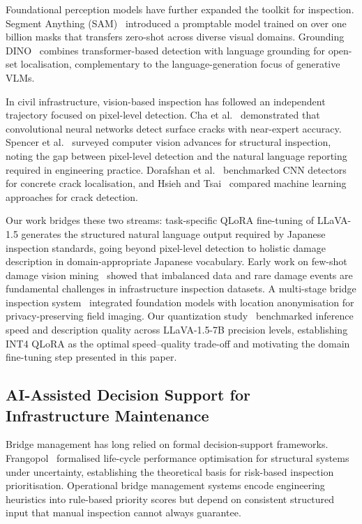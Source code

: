 \documentclass[twocolumn]{article}
\begin{document}
Foundational perception models have further expanded the toolkit for inspection.
Segment Anything (SAM)~\cite{kirillov2023sam} introduced a promptable model
trained on over one billion masks that transfers zero-shot across diverse
visual domains.
Grounding DINO~\cite{liu2023groundingdino} combines transformer-based detection
with language grounding for open-set localisation, complementary to the
language-generation focus of generative VLMs.

In civil infrastructure, vision-based inspection has followed an independent
trajectory focused on pixel-level detection.
Cha et al.~\cite{cha2017deepcrack} demonstrated that convolutional neural
networks detect surface cracks with near-expert accuracy.
Spencer et al.~\cite{spencer2019vision} surveyed computer vision advances for
structural inspection, noting the gap between pixel-level detection and the
natural language reporting required in engineering practice.
Dorafshan et al.~\cite{dorafshan2018concrete} benchmarked CNN detectors for
concrete crack localisation, and Hsieh and Tsai~\cite{hsieh2020concrete}
compared machine learning approaches for crack detection.

Our work bridges these two streams: task-specific QLoRA fine-tuning of
LLaVA-1.5 generates the structured natural language output required by
Japanese inspection standards, going beyond pixel-level detection to holistic
damage description in domain-appropriate Japanese vocabulary.
Early work on few-shot damage vision mining~\cite{yasuno2023fewshot}
showed that imbalanced data and rare damage events are fundamental
challenges in infrastructure inspection datasets.
A multi-stage bridge inspection system~\cite{yasuno2026multistage} integrated
foundation models with location anonymisation for privacy-preserving
field imaging.
Our quantization study~\cite{yasuno2026quantized} benchmarked inference
speed and description quality across LLaVA-1.5-7B precision levels,
establishing INT4 QLoRA as the optimal speed--quality trade-off
and motivating the domain fine-tuning step presented in this paper.

\subsection{AI-Assisted Decision Support for Infrastructure Maintenance}

Bridge management has long relied on formal decision-support frameworks.
Frangopol~\cite{frangopol2011lifecycle} formalised life-cycle performance
optimisation for structural systems under uncertainty, establishing the
theoretical basis for risk-based inspection prioritisation.
Operational bridge management systems encode engineering heuristics into
rule-based priority scores but depend on consistent structured input that
manual inspection cannot always guarantee.
\end{document}
